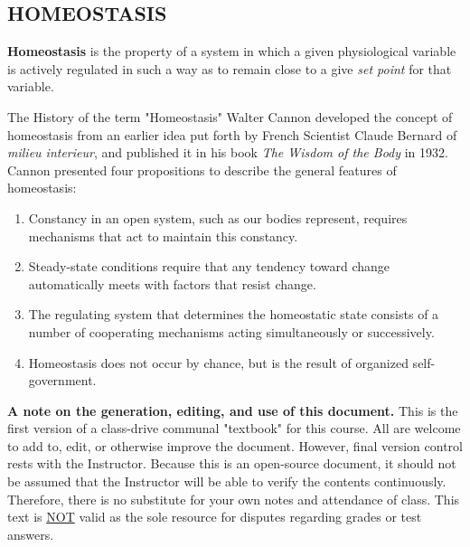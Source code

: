 \documentclass[10pt,twoside,twocolumn]{article}
\begin{document}
\subsection{HOMEOSTASIS}
\textbf{Homeostasis} is the property of a system in which a given physiological variable is actively regulated in such a way as to remain close to a give \textit{set point} for that variable. 
\begin{commentbox}{The History of the term "Homeostasis"}
	Walter Cannon developed the concept of homeostasis from an earlier idea put forth by French Scientist Claude Bernard of \textit{milieu interieur}, and published it in his book \textit{The Wisdom of the Body} in 1932. Cannon presented four propositions to describe the general features of homeostasis:
    \begin{enumerate}
\item Constancy in an open system, such as our bodies represent, requires mechanisms that act to maintain this constancy. 
\item Steady-state conditions require that any tendency toward change automatically meets with factors that resist change. 
\item The regulating system that determines the homeostatic state consists of a number of cooperating mechanisms acting simultaneously or successively. 
\item Homeostasis does not occur by chance, but is the result of organized self-government.
\end{enumerate}
\end{commentbox}

\begin{quotebox}
	\textbf{A note on the generation, editing, and use of this document.} This is the first version of a class-drive communal "textbook"  for this course. All are welcome to add to, edit, or otherwise improve the document. However, final version control rests with the Instructor. Because this is an open-source document, it should not be assumed that the Instructor will be able to verify the contents continuously. Therefore, there is no substitute for your own notes and attendance of class. This text is \underline{NOT} valid as the sole resource for disputes regarding grades or test answers. 
\end{quotebox}
\end{document}
